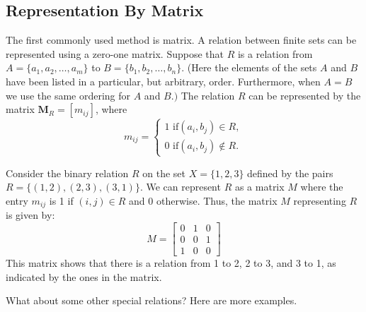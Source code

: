 	\subsection{Representation By Matrix}
	The first commonly used method is matrix. A relation between finite sets can be represented using a zero-one matrix. Suppose that $R$ is a relation from $A=\{a_1,a_2,\ldots,a_m\}$ to $B=\{b_1,b_2,\ldots,b_n\}.$ (Here the elements of the sets $A$ and $B$ have been listed in a particular, but arbitrary, order. Furthermore, when $A=B$ we use the same ordering for $A$ and $B.)$ The relation $R$ can be represented by the matrix $\mathbf{M}_R=[m_{ij}]$, where
	$$
	m_{ij}=\left\{\begin{matrix}1\text{ if}(a_i,b_j)\in R,\\0\text{ if}(a_i,b_j)\notin R.\end{matrix}\right.
	$$
	\begin{example}
		Consider the binary relation \( R \) on the set \( X = \{1, 2, 3\} \) defined by the pairs \( R = \{(1, 2), (2, 3), (3, 1)\} \). We can represent \( R \) as a matrix \( M \) where the entry \( m_{ij} \) is 1 if \( (i, j) \in R \) and 0 otherwise. Thus, the matrix \( M \) representing \( R \) is given by:
		$$
		M = \begin{bmatrix}
			0 & 1 & 0 \\
			0 & 0 & 1 \\
			1 & 0 & 0
		\end{bmatrix}
		$$
		This matrix shows that there is a relation from 1 to 2, 2 to 3, and 3 to 1, as indicated by the ones in the matrix.
	\end{example}
	What about some other special relations? Here are more examples.
